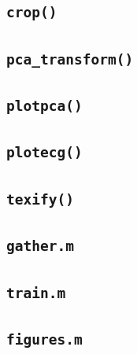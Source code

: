 \documentclass[12pt,letter]{article}
\begin{document}
\subsection{\texttt{crop()}}
\label{fun:crop}


\subsection{\texttt{pca\_transform()}}
\label{fun:pca}


\subsection{\texttt{plotpca()}}
\label{fun:plotpca}


\subsection{\texttt{plotecg()}}
\label{fun:plotecg}


\subsection{\texttt{texify()}}
\label{fun:tex}


\subsection{\texttt{gather.m}}
\label{scr:gather}


\subsection{\texttt{train.m}}
\label{scr:train}


\subsection{\texttt{figures.m}}
\label{scr:figures}




\end{document}
